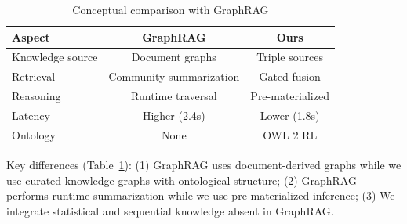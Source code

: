 \documentclass[10pt,twocolumn]{article}
\begin{document}
\begin{table}[t]
\centering
\caption{Conceptual comparison with GraphRAG}
\label{tab:graphrag_compare}
\small
\begin{tabular}{@{}lcc@{}}
\toprule
\textbf{Aspect} & \textbf{GraphRAG} & \textbf{Ours} \\
\midrule
Knowledge source & Document graphs & Triple sources \\
Retrieval & Community summarization & Gated fusion \\
Reasoning & Runtime traversal & Pre-materialized \\
Latency & Higher (2.4s) & Lower (1.8s) \\
Ontology & None & OWL 2 RL \\
\bottomrule
\end{tabular}
\end{table}

Key differences (Table~\ref{tab:graphrag_compare}): (1) GraphRAG uses document-derived graphs while we use curated knowledge graphs with ontological structure; (2) GraphRAG performs runtime summarization while we use pre-materialized inference; (3) We integrate statistical and sequential knowledge absent in GraphRAG.

\end{document}
